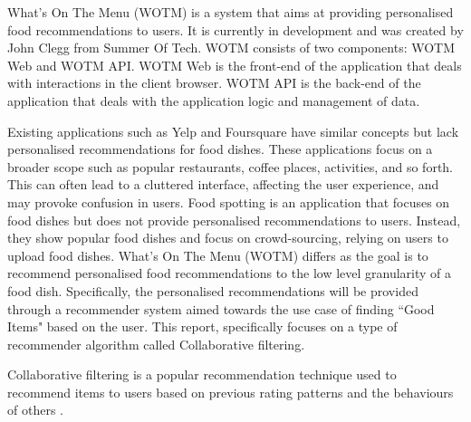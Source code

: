 What's On The Menu (WOTM) is a system that aims at providing personalised food recommendations to users. It is currently in development and was created by John Clegg from Summer Of Tech. WOTM consists of two components: WOTM Web and WOTM API. WOTM Web is the front-end of the application that deals with interactions in the client browser. WOTM API is the back-end of the application that deals with the application logic and management of data. 

Existing applications such as Yelp \cite{yelp} and Foursquare \cite{foursquare} have similar concepts but lack personalised recommendations for food dishes. These applications focus on a broader scope such as popular restaurants, coffee places, activities, and so forth. This can often lead to a cluttered interface, affecting the user experience, and may provoke confusion in users. Food spotting is an application that focuses on food dishes but does not provide personalised recommendations to users. Instead, they show popular food dishes and focus on crowd-sourcing, relying on users to upload food dishes. What's On The Menu (WOTM) differs as the goal is to recommend personalised food recommendations to the low level granularity of a food dish. Specifically, the personalised recommendations will be provided through a recommender system aimed towards the use case of finding ``Good Items" based on the user. This report, specifically focuses on a type of recommender algorithm called Collaborative filtering. 

Collaborative filtering is a popular recommendation technique used to recommend items to users based on previous rating patterns and the behaviours of others \cite{itembased, schafer2007collaborative, survey}. 

